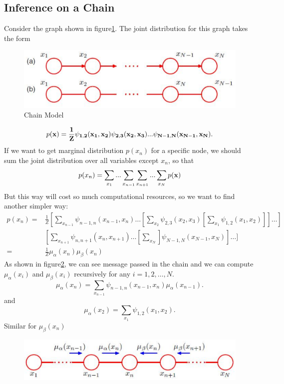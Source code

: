 \documentclass{article}
\begin{document}
\subsection{Inference on a Chain}
Consider the graph shown in figure\ref{fig9.1}. The joint distribution for this graph takes the form
\begin{figure}[H]
    \centering
    \includegraphics[width=\textwidth]{./figures/GM3.eps}
    \caption{Chain Model}
    \label{fig9.1}
\end{figure}
\begin{equation}\label{eq8.16}
  p(\bf x) = \frac{1}{Z}\psi_{1,2}(x_1,x_2)\psi_{2,3}(x_2,x_3)...\psi_{N-1,N}(x_{N-1},x_N).
\end{equation}
If we want to get marginal distribution $p(x_n)$ for a specific node, we should sum the joint distribution over all variables except $x_n$, so that
\begin{equation}\label{eq8.17}
  p(x_n) = \sum_{x_1}...\sum_{x_{n-1}}\sum_{x_{n+1}}...\sum_{x_N}p(\bf x)
\end{equation}
But this way will cost so much computational resources, so we want to find another simpler way:
\begin{align}\label{eq8.18}
  p(x_n) =  & \frac{1}{Z}[\sum_{x_{n-1}}\psi_{n-1,n}(x_{n-1},x_n)\dots[\sum_{x_2}\psi_{2,3}(x_2,x_3)[\sum_{x_1}\psi_{1,2}(x_1,x_2)]]\dots] \\
   & [\sum_{x_{n+1}}\psi_{n,n+1}(x_n,x_{n+1})\dots[\sum_{x_N}]\psi_{N-1,N}(x_{N-1},x_{N})]\dots]  \\
   = & \frac{1}{Z}\mu_{\alpha}(x_n)\mu_{\beta}(x_n)
\end{align}
As shown in figure\ref{fig9.2}, we can see message passed in the chain and we can compute $\mu_{\alpha}(x_i)$ and $\mu_{\beta}(x_i)$ recursively for any $i=1, 2, \dots, N$.
\begin{equation}\label{eq8.19}
  \mu_{\alpha}(x_n) = \sum_{x_{n-1}}\psi_{n-1,n}(x_{n-1},x_n)\mu_{\alpha}(x_{n-1}).
\end{equation}
and
\begin{equation}\label{eq8.20}
  \mu_{\alpha}(x_2) = \sum_{x_1}\psi_{1,2}(x_1,x_2).
\end{equation}
Similar for $\mu_{\beta}(x_n)$
\begin{figure}[H]
  \centering
  \includegraphics[width=\textwidth]{./figures/GM4.eps}
  \label{fig9.2}
\end{figure}
\end{document}
